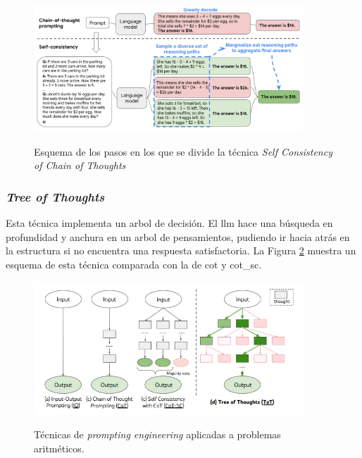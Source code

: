 \begin{figure}[H]
    \caption[]{Esquema de los pasos en los que se divide la técnica \textit{Self Consistency of Chain of Thoughts}}
    \centering
    \includegraphics[width=0.9\textwidth]{./figuras/cot_sc.png}
    \label{fig:cot_sc}
\end{figure}

\subsubsection{\textit{Tree of Thoughts}}

Esta técnica implementa un arbol de decisión. El \gls{llm} hace una búsqueda en profundidad y anchura en un arbol de pensamientos, pudiendo ir hacia atrás en la estructura si no encuentra una respuesta satisfactoria. La Figura \ref{fig:prompting_engineering} muestra un esquema de esta técnica comparada con la de \gls{cot} y \gls{cot_sc}.

\begin{figure}[H]
  \caption[Técnicas de \textit{prompting engineering}]{Técnicas de \textit{prompting engineering} aplicadas a problemas aritméticos.}
  \centering
  \includegraphics[width=0.9\textwidth]{./figuras/prompt_engineering_techniques.png}
  \label{fig:prompting_engineering}
\end{figure}


